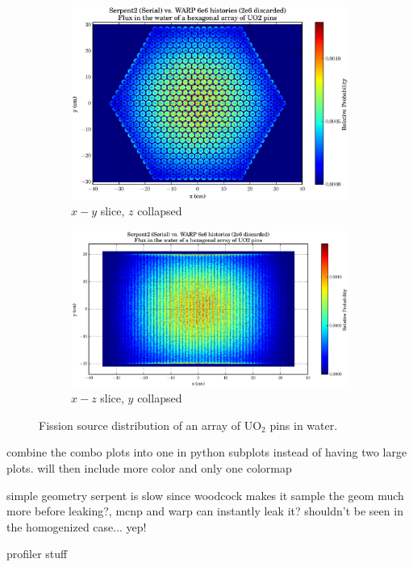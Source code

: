 \begin{figure}[h!]
\centering
\begin{subfigure}{.5\textwidth}
  \centering
  \includegraphics[width=\linewidth]{graphics/finalresults/assembly_fiss1.eps}
  \caption{$x-y$ slice, $z$ collapsed}
  \label{fig:sub1}
\end{subfigure}%
\begin{subfigure}{.5\textwidth}
  \centering
  \includegraphics[width=\linewidth]{graphics/finalresults/assembly_fiss2.eps}
  \caption{$x-z$ slice, $y$ collapsed}
  \label{fig:sub2}
\end{subfigure}
\caption{Fission source distribution of an array of UO$_2$ pins in water. \label{assembly_fiss} }
\end{figure}

combine the combo plots into one in python subplots instead of having two large plots.  will then include more color and only one colormap

simple geometry serpent is slow since woodcock makes it sample the geom much more before leaking?, mcnp and warp can instantly leak it?  shouldn't be seen in the homogenized case... yep!


profiler stuff

